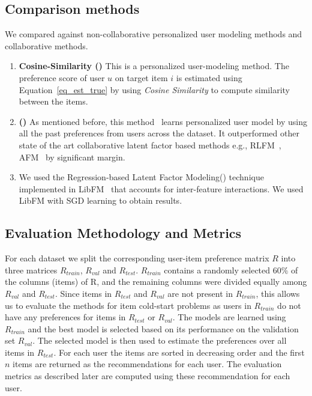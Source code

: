 

\subsection{Comparison methods} \label{other_methods}
We compared \CF against non-collaborative personalized user modeling methods and
collaborative methods.

\begin{enumerate}
  \item \textbf{Cosine-Similarity (\COSIM)}
       This is a personalized user-modeling method.
        The preference score of user $u$ on target item $i$ is estimated using
        Equation~\ref{eq_est_true} by using \emph{Cosine Similarity} to compute
        similarity between the items.
  \item{\textbf{\CFLINEXP (\CFLIN)}}
        As mentioned before, this method~\cite{elbadrawy2015} learns personalized user model
        by using all the past preferences from users across the dataset. It
        outperformed other state of the art collaborative latent factor based methods e.g.,
        RLFM~\cite{agarwal09},  AFM~\cite{gantner10} by significant margin.
  \item{\textbf{\RLFMI}}
        We used the Regression-based Latent Factor Modeling(\RLFM) technique
        implemented in LibFM~\cite{rendle12libfm} that accounts for inter-feature interactions. We
        used LibFM with SGD learning to obtain results.
\end{enumerate}




\subsection{Evaluation Methodology and Metrics}
For each dataset we split the corresponding user-item preference matrix  $R$ into three
matrices $R_{train}$, $R_{val}$ and $R_{test}$. $R_{train}$ contains a randomly
selected $60\%$ of the columns (items) of R, and the remaining columns were divided equally
among $R_{val}$ and $R_{test}$. Since items in $R_{test}$ and $R_{val}$ are not
present in $R_{train}$, this allows us to evaluate the methods for item cold-start
problems as users in $R_{train}$ do not have any preferences for items in
$R_{test}$ or $R_{val}$. 
The models are learned using $R_{train}$ and the best model is
selected based on its performance on the validation set $R_{val}$. The selected model
is then used to estimate the preferences over all items in $R_{test}$. For each
user the items are sorted in decreasing order and the first $n$ items are returned
as the \TOPN recommendations for each user. The evaluation metrics as described
later are computed using these \TOPN recommendation for each user. 

